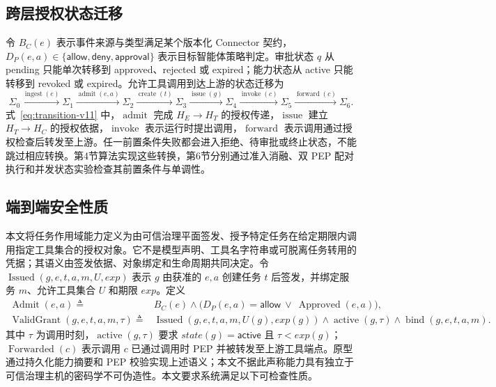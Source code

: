 \subsection{跨层授权状态迁移}

令 $B_C(e)$ 表示事件来源与类型满足某个版本化 Connector 契约，$D_P(e,a)\in\{\mathsf{allow},\mathsf{deny},\mathsf{approval}\}$ 表示目标智能体策略判定。审批状态 $q$ 从 pending 只能单次转移到 approved、rejected 或 expired；能力状态从 active 只能转移到 revoked 或 expired。允许工具调用到达上游的状态迁移为
\begin{equation}
\Sigma_0 \xrightarrow{\operatorname{ingest}(e)}
\Sigma_1 \xrightarrow{\operatorname{admit}(e,a)}
\Sigma_2 \xrightarrow{\operatorname{create}(t)}
\Sigma_3 \xrightarrow{\operatorname{issue}(g)}
\Sigma_4 \xrightarrow{\operatorname{invoke}(c)}
\Sigma_5 \xrightarrow{\operatorname{forward}(c)} \Sigma_6 .
\label{eq:transition-v11}
\end{equation}
式~\eqref{eq:transition-v11} 中，$\operatorname{admit}$ 完成 $H_E\rightarrow H_T$ 的授权传递，$\operatorname{issue}$ 建立 $H_T\rightarrow H_C$ 的授权依据，$\operatorname{invoke}$ 表示运行时提出调用，$\operatorname{forward}$ 表示调用通过授权检查后转发至上游。任一前置条件失败都会进入拒绝、待审批或终止状态，不能跳过相应转换。第4节算法实现这些转换，第6节分别通过准入消融、双 PEP 配对执行和并发状态实验检查其前置条件与单调性。

\subsection{端到端安全性质}

本文将任务作用域能力定义为由可信治理平面签发、授予特定任务在给定期限内调用指定工具集合的授权对象。它不是模型声明、工具名字符串或可脱离任务转用的凭据；其语义由签发依据、对象绑定和生命周期共同决定。令 $\operatorname{Issued}(g,e,t,a,m,U,exp)$ 表示 $g$ 由获准的 $e,a$ 创建任务 $t$ 后签发，并绑定服务 $m$、允许工具集合 $U$ 和期限 $exp$。定义
\begin{align}
\operatorname{Admit}(e,a) \triangleq {}& B_C(e)\land
\bigl(D_P(e,a)=\mathsf{allow}\ \lor\ \operatorname{Approved}(e,a)\bigr), \\
\operatorname{ValidGrant}(g,e,t,a,m,\tau) \triangleq {}&
\operatorname{Issued}(g,e,t,a,m,U(g),exp(g))\land
\operatorname{active}(g,\tau)\land
\operatorname{bind}(g,e,t,a,m).
\label{eq:predicates-v11}
\end{align}
其中 $\tau$ 为调用时刻，$\operatorname{active}(g,\tau)$ 要求 $state(g)=\mathsf{active}$ 且 $\tau<exp(g)$；$\operatorname{Forwarded}(c)$ 表示调用 $c$ 已通过调用时 PEP 并被转发至上游工具端点。原型通过持久化能力摘要和 PEP 校验实现上述语义；本文不据此声称能力具有独立于可信治理主机的密码学不可伪造性。本文要求系统满足以下可检查性质。


